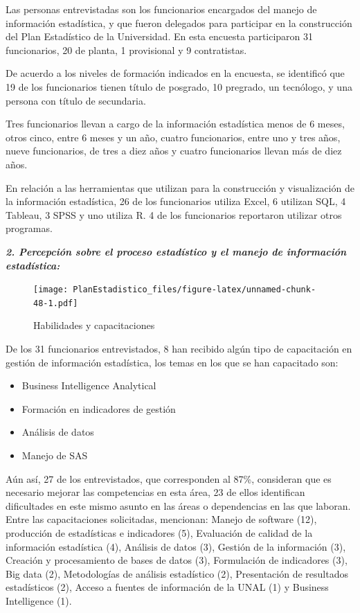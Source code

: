 \documentclass[
]{book}
\providecommand{\tightlist}{%
  \setlength{\itemsep}{0pt}\setlength{\parskip}{0pt}}
\begin{document}
Las personas entrevistadas son los funcionarios encargados del manejo de información estadística,
y que fueron delegados para participar en la construcción del Plan Estadístico de la Universidad. En
esta encuesta participaron 31 funcionarios, 20 de planta, 1 provisional y 9 contratistas.

De acuerdo a los niveles de formación indicados en la encuesta, se identificó que 19 de los
funcionarios tienen título de posgrado, 10 pregrado, un tecnólogo, y una persona con título de
secundaria.

Tres funcionarios llevan a cargo de la información estadística menos de 6 meses, otros cinco, entre 6
meses y un año, cuatro funcionarios, entre uno y tres años, nueve funcionarios, de tres a diez años y cuatro funcionarios llevan más de diez años.

En relación a las herramientas que utilizan para la construcción y visualización de la información
estadística, 26 de los funcionarios utiliza Excel, 6 utilizan SQL, 4 Tableau, 3 SPSS y uno utiliza R. 4 de
los funcionarios reportaron utilizar otros programas.

\textbf{\emph{2. Percepción sobre el proceso estadístico y el manejo de información estadística:}}

\begin{figure}
\centering
\texttt{[image: PlanEstadistico\_files/figure-latex/unnamed-chunk-48-1.pdf]}
\caption{\label{fig:unnamed-chunk-48}Habilidades y capacitaciones}
\end{figure}

De los 31 funcionarios entrevistados, 8 han recibido algún tipo de capacitación en gestión de información estadística, los temas en los que se han capacitado son:

\begin{itemize}
\tightlist
\item
  Business Intelligence Analytical
\item
  Formación en indicadores de gestión
\item
  Análisis de datos
\item
  Manejo de SAS
\end{itemize}

Aún así, 27 de los entrevistados, que corresponden al 87\%, consideran que es necesario mejorar las competencias en esta área, 23 de ellos identifican dificultades en este mismo asunto en las áreas o dependencias en las que laboran. Entre las capacitaciones solicitadas, mencionan: Manejo de software (12), producción de estadísticas e indicadores (5), Evaluación de calidad de la información estadística (4), Análisis de datos (3), Gestión de la información (3), Creación y procesamiento de bases de datos (3), Formulación de indicadores (3), Big data (2), Metodologías de análisis estadístico (2), Presentación de resultados estadísticos (2), Acceso a fuentes de información de la UNAL (1) y Business Intelligence (1).
\end{document}
